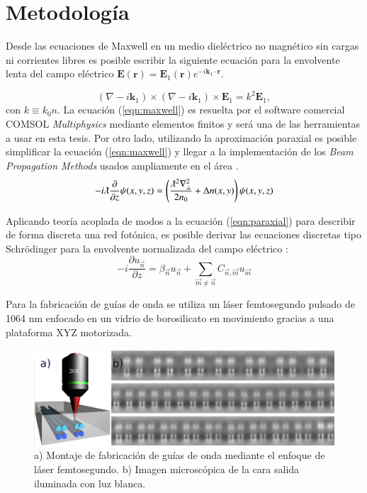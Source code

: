 \documentclass{article}
\begin{document}
\section{Metodología}

Desde las ecuaciones de Maxwell en un medio dieléctrico no magnético sin cargas ni corrientes libres es posible escribir la siguiente ecuación para la envolvente lenta del campo eléctrico $\textbf{E}(\textbf{r}) = \textbf{E}_1(\textbf{r}) e^{-i \textbf{k}_1 \cdot \textbf{r}}$.

\begin{equation}
	(\nabla-i\textbf{k}_1)\times(\nabla-i\textbf{k}_1)\times \textbf{E}_1 = k^2 \textbf{E}_1,
	 \label{eqn:maxwell}
\end{equation}
con $k \equiv k_0 n$.
La ecuación (\ref{eqn:maxwell}) es resuelta por el software comercial COMSOL \textit{Multiphysics} mediante elementos finitos y será una de las herramientas a usar en esta tesis. Por otro lado, utilizando la aproximación paraxial es posible simplificar la ecuación (\ref{eqn:maxwell}) y llegar a la implementación de los \textit{Beam Propagation Methods} usados ampliamente en el área \cite{bics, interorbital, OAMCaging, vortex, bpm}.
\begin{equation}
	-i\lambdabar\frac{\partial}{\partial z}\psi(x,y,z) = \left(\frac{\lambdabar^2\nabla_\perp^2}{2n_0} + \Delta n(x,y)\right) \psi (x,y,z) \label{eqn:paraxial}
\end{equation}

Aplicando teoría acoplada de modos a la ecuación (\ref{eqn:paraxial}) para describir de forma discreta una red fotónica, es posible derivar las ecuaciones discretas tipo Schrödinger para la envolvente normalizada del campo eléctrico \cite{discretesolitons}:
\begin{equation}
	-i\frac{\partial u_{\vec{n}} }{\partial z} = \beta_{\vec{n}}u_{\vec{n}} + \sum_{\vec{m}\neq\vec{n}} C_{\vec{n},\vec{m}}u_{\vec{m}} \label{eqn:CMT}
\end{equation}

Para la fabricación de guías de onda se utiliza un láser femtosegundo pulsado de 1064 nm enfocado en un vidrio de borosilicato en movimiento gracias a una plataforma XYZ motorizada.

\begin{figure}[H]
	\centering
	\includegraphics[width=0.9\linewidth]{./media/femtosetup.png}
	\caption{a) Montaje de fabricación de guías de onda mediante el enfoque de láser femtosegundo. b)      Imagen microscópica de la cara salida iluminada con luz blanca. \label{fig:SLM}}
\end{figure}
\end{document}
